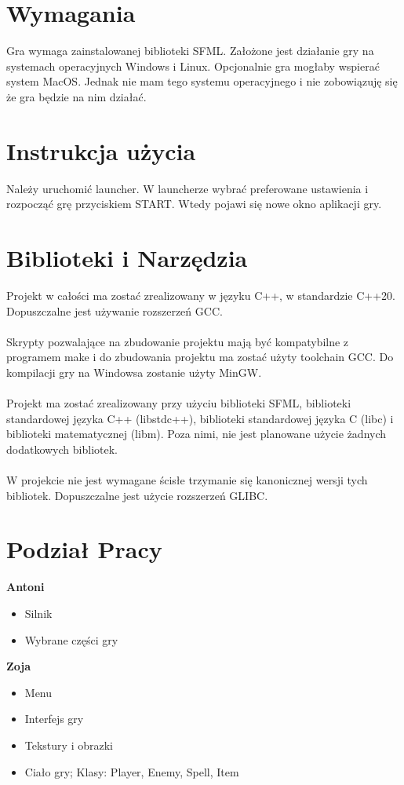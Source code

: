 \documentclass[12pt, titlepage]{article}
\begin{document}
\section{Wymagania}
Gra wymaga zainstalowanej biblioteki
SFML. Założone jest działanie gry
na systemach operacyjnych Windows i
Linux. Opcjonalnie gra mogłaby wspierać
system MacOS. Jednak nie mam tego
systemu operacyjnego i nie zobowiązuję
się że gra będzie na nim działać.

\newpage
\section{Instrukcja użycia}
Należy uruchomić launcher. W
launcherze wybrać preferowane
ustawienia i rozpocząć grę
przyciskiem START. Wtedy pojawi
się nowe okno aplikacji gry.

\section{Biblioteki i Narzędzia}
Projekt w całości ma zostać zrealizowany
w języku C++, w standardzie C++20.
Dopuszczalne jest używanie rozszerzeń
GCC.
\\~\\
Skrypty pozwalające na zbudowanie
projektu mają być kompatybilne z
programem make i do zbudowania
projektu ma zostać użyty toolchain
GCC. Do kompilacji gry na Windowsa
zostanie użyty MinGW.
\\~\\
Projekt ma zostać zrealizowany przy
użyciu biblioteki SFML, biblioteki
standardowej języka C++ (libstdc++),
biblioteki standardowej języka C (libc)
i biblioteki matematycznej (libm). Poza
nimi, nie jest planowane użycie żadnych
dodatkowych bibliotek.
\\~\\
W projekcie nie jest wymagane ścisłe
trzymanie się kanonicznej wersji tych
bibliotek. Dopuszczalne jest użycie
rozszerzeń GLIBC.

\section{Podział Pracy}
\textbf{Antoni}
\begin{itemize}
	\item Silnik
	\item Wybrane części gry
\end{itemize}
 
\noindent
\textbf{Zoja}
\begin{itemize}
	\item Menu
	\item Interfejs gry
	\item Tekstury i obrazki
	\item Ciało gry; Klasy: Player, Enemy, Spell, Item
\end{itemize}
\end{document}
